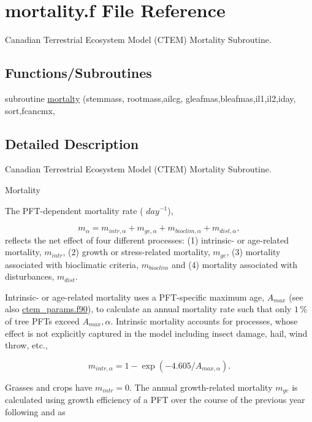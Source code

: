 \hypertarget{mortality_8f}{}\section{mortality.\+f File Reference}
\label{mortality_8f}


Canadian Terrestrial Ecosystem Model (C\+T\+E\+M) Mortality Subroutine.  


\subsection*{Functions/\+Subroutines}
\begin{DoxyCompactItemize}
\item 
subroutine \hyperlink{mortality_8f_a498b6ca22ad5d0ab1cd326d468801750}{mortalty} (stemmass, rootmass,ailcg, gleafmas,bleafmas,il1,il2,iday, sort,fcancmx,
\end{DoxyCompactItemize}


\subsection{Detailed Description}
Canadian Terrestrial Ecosystem Model (C\+T\+E\+M) Mortality Subroutine. 

Mortality

The P\+F\+T-\/dependent mortality rate ( $day^{-1}$),

\[ \label{mortality} m_{\alpha} = m_{intr,\alpha} + m_{ge,\alpha} + m_{bioclim,\alpha} + m_{dist,\alpha}, \] reflects the net effect of four different processes\+: (1) intrinsic-\/ or age-\/related mortality, $m_{intr}$, (2) growth or stress-\/related mortality, $m_{ge}$, (3) mortality associated with bioclimatic criteria, $m_{bioclim}$ and (4) mortality associated with disturbances, $m_{dist}$.

Intrinsic-\/ or age-\/related mortality uses a P\+F\+T-\/specific maximum age, $A_{max}$ (see also \hyperlink{ctem__params_8f90}{ctem\+\_\+params.\+f90}), to calculate an annual mortality rate such that only $1\,{\%}$ of tree P\+F\+Ts exceed $A_{max},\alpha$. Intrinsic mortality accounts for processes, whose effect is not explicitly captured in the model including insect damage, hail, wind throw, etc.,

\[ \label{intrmort} m_{intr,\alpha} = 1 - \exp(-4.605/A_{max,\alpha}). \]

Grasses and crops have $m_{intr} = 0$. The annual growth-\/related mortality $m_{ge}$ is calculated using growth efficiency of a P\+F\+T over the course of the previous year following \cite{Prentice1993-xn} and \cite{Sitch2003-847} as

